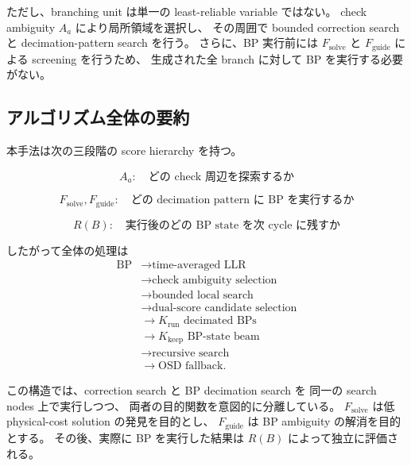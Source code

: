 ただし、branching unit は単一の least-reliable variable ではない。
check ambiguity $A_a$ により局所領域を選択し、
その周囲で bounded correction search と
decimation-pattern search を行う。
さらに、BP 実行前には
$F_{\mathrm{solve}}$ と $F_{\mathrm{guide}}$ による screening を行うため、
生成された全 branch に対して BP を実行する必要がない。


\subsection{アルゴリズム全体の要約}

本手法は次の三段階の score hierarchy を持つ。

\begin{equation}
    \boxed{
    A_a:
    \quad
    \text{どの check 周辺を探索するか}
    }
\end{equation}

\begin{equation}
    \boxed{
    F_{\mathrm{solve}},
    F_{\mathrm{guide}}:
    \quad
    \text{どの decimation pattern に BP を実行するか}
    }
\end{equation}

\begin{equation}
    \boxed{
    R(B):
    \quad
    \text{実行後のどの BP state を次 cycle に残すか}
    }
\end{equation}

したがって全体の処理は
\begin{equation}
\boxed{
\begin{aligned}
\text{BP}
&\rightarrow
\text{time-averaged LLR}
\\
&\rightarrow
\text{check ambiguity selection}
\\
&\rightarrow
\text{bounded local search}
\\
&\rightarrow
\text{dual-score candidate selection}
\\
&\rightarrow
K_{\mathrm{run}}\text{ decimated BPs}
\\
&\rightarrow
K_{\mathrm{keep}}\text{ BP-state beam}
\\
&\rightarrow
\text{recursive search}
\\
&\rightarrow
\text{OSD fallback}.
\end{aligned}
}
\end{equation}

この構造では、correction search と BP decimation search を
同一の search nodes 上で実行しつつ、
両者の目的関数を意図的に分離している。
$F_{\mathrm{solve}}$ は低 physical-cost solution の発見を目的とし、
$F_{\mathrm{guide}}$ は BP ambiguity の解消を目的とする。
その後、実際に BP を実行した結果は
$R(B)$ によって独立に評価される。

